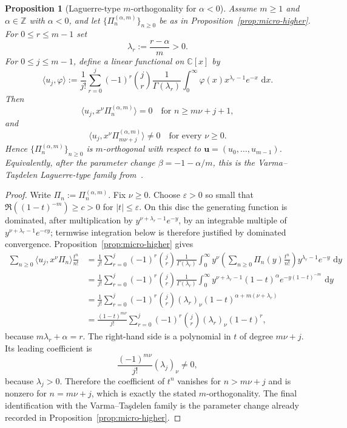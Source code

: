 \documentclass[reqno]{article}
\newtheorem{prop}[theorem]{Proposition}
\theoremstyle{definition}
\theoremstyle{remark}
\theoremstyle{plain}
\newcommand{\C}{\mathbb C}
\newcommand{\dd}{\,\mathrm d}
\begin{document}
\begin{prop}[Laguerre-type $m$-orthogonality for $\alpha<0$]\label{prop:micro-dorth}
Assume $m\ge1$ and $\alpha\in\mathbb Z$ with $\alpha<0$, and let $\{\Pi_n^{(\alpha,m)}\}_{n\ge0}$ be as in Proposition~\ref{prop:micro-higher}. For $0\le r\le m-1$ set
$$\lambda_r:=\frac{r-\alpha}{m}>0.$$
For $0\le j\le m-1$, define a linear functional on $\C[x]$ by
$$\langle u_j,\varphi\rangle:=\frac1{j!}\sum_{r=0}^j(-1)^r\binom{j}{r}\frac1{\Gamma(\lambda_r)}
\int_0^\infty \varphi(x)x^{\lambda_r-1}e^{-x}\,\dd x.$$
Then
$$\langle u_j,x^\nu\Pi_n^{(\alpha,m)}\rangle=0\quad\text{for }n\ge m\nu+j+1,$$
and
$$\langle u_j,x^\nu\Pi_{m\nu+j}^{(\alpha,m)}\rangle\ne0\quad\text{for every }\nu\ge0.$$
Hence $\{\Pi_n^{(\alpha,m)}\}_{n\ge0}$ is $m$-orthogonal with respect to $\mathbf{u}=(u_0,\dots,u_{m-1})$. Equivalently, after the parameter change $\beta=-1-\alpha/m$, this is the Varma--Ta\c{s}delen Laguerre-type family from~\cite{VT}.
\end{prop}

\begin{proof}
Write $\Pi_n:=\Pi_n^{(\alpha,m)}$. Fix $\nu\ge0$. Choose $\varepsilon>0$ so small that $\Re((1-t)^{-m})\ge c>0$ for $|t|\le\varepsilon$. On this disc the generating function is dominated, after multiplication by $y^{\nu+\lambda_r-1}e^{-y}$, by an integrable multiple of $y^{\nu+\lambda_r-1}e^{-cy}$; termwise integration below is therefore justified by dominated convergence. Proposition~\ref{prop:micro-higher} gives
\begin{align*}
\sum_{n\ge0}\langle u_j,x^\nu\Pi_n\rangle\frac{t^n}{n!}
&=\frac1{j!}\sum_{r=0}^j(-1)^r\binom{j}{r}\frac1{\Gamma(\lambda_r)}
\int_0^\infty y^\nu\left(\sum_{n\ge0}\Pi_n(y)\frac{t^n}{n!}\right)y^{\lambda_r-1}e^{-y}\,\dd y\\
&=\frac1{j!}\sum_{r=0}^j(-1)^r\binom{j}{r}\frac1{\Gamma(\lambda_r)}
\int_0^\infty y^{\nu+\lambda_r-1}(1-t)^\alpha e^{-y(1-t)^{-m}}\,\dd y\\
&=\frac1{j!}\sum_{r=0}^j(-1)^r\binom{j}{r}(\lambda_r)_\nu
(1-t)^{\alpha+m(\nu+\lambda_r)}\\
&=\frac{(1-t)^{m\nu}}{j!}\sum_{r=0}^j(-1)^r\binom{j}{r}(\lambda_r)_\nu(1-t)^r,
\end{align*}
because $m\lambda_r+\alpha=r$. The right-hand side is a polynomial in $t$ of degree $m\nu+j$. Its leading coefficient is
$$\frac{(-1)^{m\nu}}{j!}(\lambda_j)_\nu\ne0,$$
because $\lambda_j>0$. Therefore the coefficient of $t^n$ vanishes for $n>m\nu+j$ and is nonzero for $n=m\nu+j$, which is exactly the stated $m$-orthogonality. The final identification with the Varma--Ta\c{s}delen family is the parameter change already recorded in Proposition~\ref{prop:micro-higher}.
\end{proof}
\end{document}

